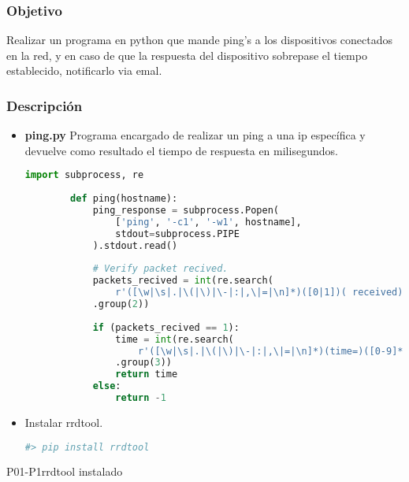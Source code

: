 \subsubsection{Objetivo}
Realizar un programa en python que mande ping's a los dispositivos conectados en la red, y en caso de que la respuesta del dispositivo sobrepase el tiempo establecido, notificarlo via emal.

\subsubsection{Descripción}
\begin{itemize}
	\item {\bf ping.py} Programa encargado de realizar un ping a una ip específica y devuelve como resultado el tiempo de respuesta en milisegundos.\\
	\begin{lstlisting}[language=python]
		import subprocess, re
		
		def ping(hostname):
			ping_response = subprocess.Popen(
				['ping', '-c1', '-w1', hostname],
				stdout=subprocess.PIPE
			).stdout.read()
			
			# Verify packet recived.
			packets_recived = int(re.search(
				r'([\w|\s|.|\(|\)|\-|:|,\|=|\n]*)([0|1])( received)', ping_response)
			.group(2))
			
			if (packets_recived == 1):
				time = int(re.search(
					r'([\w|\s|.|\(|\)|\-|:|,\|=|\n]*)(time=)([0-9]*)( ms)', ping_response)
				.group(3))
				return time
			else:
				return -1
	\end{lstlisting}
	\item Instalar rrdtool.\\
	\begin{lstlisting}[language=bash]
	#> pip install rrdtool
	\end{lstlisting}
\end{itemize}

\newpage
\begin{prueba}{P01-P1}{rrdtool instalado}
\end{prueba}
